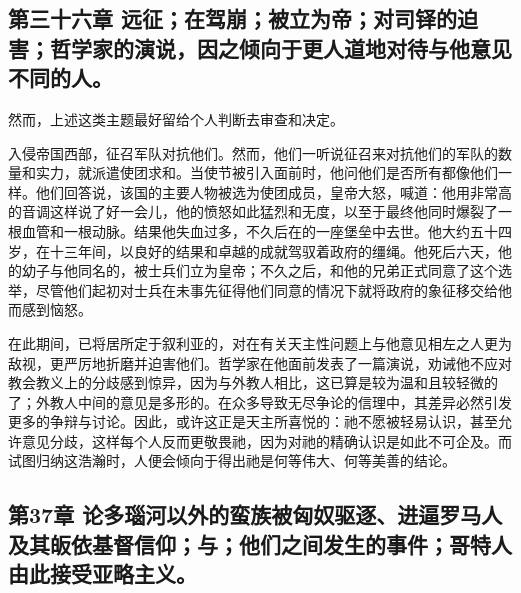 
\subsection{第三十六章 远征；在驾崩；被立为帝；对司铎的迫害；哲学家的演说，因之倾向于更人道地对待与他意见不同的人。}

然而，上述这类主题最好留给个人判断去审查和决定。\par

入侵帝国西部，征召军队对抗他们。然而，他们一听说征召来对抗他们的军队的数量和实力，就派遣使团求和。当使节被引入面前时，他问他们是否所有都像他们一样。他们回答说，该国的主要人物被选为使团成员，皇帝大怒，喊道：他用非常高的音调这样说了好一会儿，他的愤怒如此猛烈和无度，以至于最终他同时爆裂了一根血管和一根动脉。结果他失血过多，不久后在的一座堡垒中去世。他大约五十四岁，在十三年间，以良好的结果和卓越的成就驾驭着政府的缰绳。他死后六天，他的幼子与他同名的，被士兵们立为皇帝；不久之后，和他的兄弟正式同意了这个选举，尽管他们起初对士兵在未事先征得他们同意的情况下就将政府的象征移交给他而感到恼怒。\par

在此期间，已将居所定于叙利亚的，对在有关天主性问题上与他意见相左之人更为敌视，更严厉地折磨并迫害他们。哲学家在他面前发表了一篇演说，劝诫他不应对教会教义上的分歧感到惊异，因为与外教人相比，这已算是较为温和且较轻微的了；外教人中间的意见是多形的。在众多导致无尽争论的信理中，其差异必然引发更多的争辩与讨论。因此，或许这正是天主所喜悦的：祂不愿被轻易认识，甚至允许意见分歧，这样每个人反而更敬畏祂，因为对祂的精确认识是如此不可企及。而试图归纳这浩瀚时，人便会倾向于得出祂是何等伟大、何等美善的结论。\par


\subsection{第37章 论多瑙河以外的蛮族被匈奴驱逐、进逼罗马人及其皈依基督信仰；与；他们之间发生的事件；哥特人由此接受亚略主义。}

